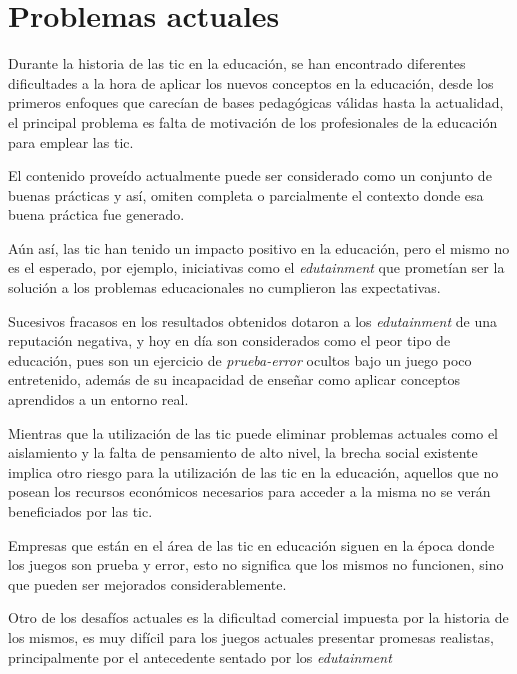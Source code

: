 \section{Problemas actuales}

Durante la historia de las \Gls{tic} en la educación, se han encontrado
diferentes dificultades a la hora de aplicar los nuevos conceptos en la
educación, desde los primeros enfoques que carecían de bases pedagógicas válidas
hasta la actualidad, el principal problema es falta de motivación de los
profesionales de la educación para emplear las
\Gls{tic}\cite{punie:ict}\cite{ict:romeo}.

El contenido proveído actualmente puede ser considerado como un conjunto de
buenas prácticas\cite{punie:ict} y así, omiten completa o parcialmente el
contexto donde esa buena práctica fue generado.

Aún así, las \Gls{tic} han tenido un impacto positivo en la educación, pero el
mismo no es el esperado\cite{punie:ict}, por ejemplo, iniciativas como el
\emph{edutainment} que prometían ser la solución a los problemas
educacionales no cumplieron las expectativas. 

Sucesivos fracasos en los resultados obtenidos dotaron a los \emph{edutainment}
de una reputación negativa, y hoy en día son considerados como el peor tipo de
educación, pues son un ejercicio de \emph{prueba-error} ocultos bajo un juego
poco entretenido\cite{resnick:2004}, además de su incapacidad de enseñar como
aplicar conceptos aprendidos a un entorno real\cite{resnick:2004}.

Mientras que la utilización de las \Gls{tic} puede eliminar problemas actuales
como el aislamiento y la falta de pensamiento de alto nivel\cite{punie:ict}, la
brecha social existente implica otro riesgo para la utilización de las \Gls{tic}
en la educación, aquellos que no posean los recursos económicos necesarios para
acceder a la misma no se verán beneficiados por las \Gls{tic}\cite{punie:ict}.

Empresas que están en el área de las \Gls{tic} en educación siguen en la época
donde los juegos son prueba y error, esto no significa que los mismos no
funcionen, sino que pueden ser mejorados
considerablemente\cite{egenfeldt2007third}.

Otro de los desafíos actuales es la dificultad comercial impuesta por la
historia de los mismos, es muy difícil para los juegos actuales presentar
promesas realistas, principalmente por el antecedente sentado por los
\emph{edutainment}\cite{egenfeldt2007third}
